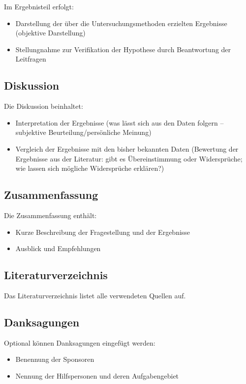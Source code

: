 Im Ergebnisteil erfolgt:
\begin{itemize}
	\item Darstellung der über die Untersuchungsmethoden erzielten Ergebnisse (objektive Darstellung)
	\item Stellungnahme zur Verifikation der Hypothese durch Beantwortung der Leitfragen
\end{itemize}

\subsection*{Diskussion}
\label{subsec:diskussion_struktur}

Die Diskussion beinhaltet:
\begin{itemize}
	\item Interpretation der Ergebnisse (was lässt sich aus den Daten folgern -- subjektive Beurteilung/persönliche Meinung)
	\item Vergleich der Ergebnisse mit den bisher bekannten Daten (Bewertung der Ergebnisse aus der Literatur: gibt es Übereinstimmung oder Widersprüche; wie lassen sich mögliche Widersprüche erklären?)
\end{itemize}

\subsection*{Zusammenfassung}
\label{subsec:zusammenfassung_struktur}

Die Zusammenfassung enthält:
\begin{itemize}
	\item Kurze Beschreibung der Fragestellung und der Ergebnisse
	\item Ausblick und Empfehlungen
\end{itemize}

\subsection*{Literaturverzeichnis}
\label{subsec:literatur_struktur}

Das Literaturverzeichnis listet alle verwendeten Quellen auf.

\subsection*{Danksagungen}
\label{subsec:danksagungen_struktur}

Optional können Danksagungen eingefügt werden:
\begin{itemize}
	\item Benennung der Sponsoren
	\item Nennung der Hilfspersonen und deren Aufgabengebiet
\end{itemize}

